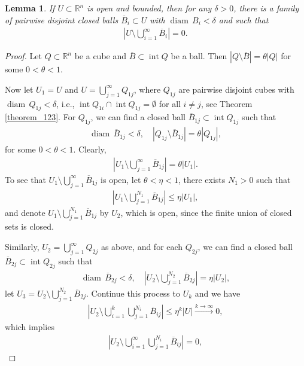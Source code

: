 \documentclass[11pt]{book}
\newtheorem{lemma}{Lemma}[chapter]
\theoremstyle{definition}
\numberwithin{equation}{chapter}
\def\diam{{\operatorname{diam}\,}}
\begin{document}
\begin{lemma}\label{lemma_13}
If $U \subset \mathbb{R}^n$ is open and bounded, then for any $\delta > 0$, there is a family of pairwise disjoint closed balls $\overline{B}_i \subset U$ with $\diam B_i < \delta$ and such that
\begin{align*}
    \left|U \setminus \bigcup^\infty_{i=1} \overline{B}_i\right| = 0.
\end{align*}
\end{lemma}
\begin{proof}
Let $Q \subset \mathbb{R}^n$ be a cube and $\overline{B} \subset \operatorname{int} Q$ be a ball. Then $\left|Q \setminus \overline{B}\right| = \theta \left|Q\right|$ for some $0 < \theta < 1$. 

Now let $U_1 = U$ and $U = \bigcup^\infty_{j=1} Q_{1j}$, where $Q_{1j}$ are pairwise disjoint cubes with $\diam Q_{1j} < \delta$, i.e., $\operatorname{int} Q_{1i} \cap \operatorname{int} Q_{1j} = \emptyset$ for all $i \neq j$, see Theorem \ref{theorem_123}. For $Q_{1j}$, we can find a closed ball $\overline{B}_{1j} \subset \operatorname{int} Q_{1j}$ such that 
\begin{align*}
    \diam \overline{B}_{1j} < \delta, \quad \left|Q_{1j} \setminus \overline{B}_{1j}\right| = \theta \left|Q_{1j}\right|,
\end{align*}
for some $0 < \theta < 1$. Clearly,
\begin{align*}
    \left|U_1 \setminus \bigcup^\infty_{j=1} \overline{B}_{1j}\right| = \theta \left|U_1\right|.
\end{align*}
To see that $U_1 \setminus \bigcup^\infty_{j=1} \overline{B}_{1j}$ is open, let $\theta < \eta < 1$, there exists $N_1 > 0$ such that
\begin{align*}
    \left|U_1 \setminus \bigcup^{N_1}_{j=1} \overline{B}_{1j}\right| \leq \eta \left|U_1\right|,
\end{align*}
and denote $U_1 \setminus \bigcup^{N_1}_{j=1} \overline{B}_{1j}$ by $U_2$, which is open, since the finite union of closed sets is closed. 

Similarly, $U_2 = \bigcup^\infty_{j=1} Q_{2j}$ as above, and for each $Q_{2j}$, we can find a closed ball $\overline{B}_{2j} \subset \operatorname{int} Q_{2j}$ such that
\begin{align*}
    \diam \overline{B}_{2j} < \delta, \quad \left|U_2 \setminus \bigcup^{N_2}_{j=1} \overline{B}_{2j}\right| = \eta \left|U_2\right|,
\end{align*}
let $U_3 = U_2 \setminus \bigcup^{N_2}_{j=1} \overline{B}_{2j}$. Continue this process to $U_k$ and we have
\begin{align*}
    \left|U_2 \setminus \bigcup^k_{i=1} \bigcup^{N_i}_{j=1} \overline{B}_{ij}\right| \leq \eta^k \left|U\right| \xrightarrow[]{k \to \infty} 0,
\end{align*}
which implies
\begin{align*}
    \left|U_2 \setminus \bigcup^\infty_{i=1} \bigcup^{N_i}_{j=1} \overline{B}_{ij}\right| = 0,
\end{align*}
\end{proof}
\end{document}
